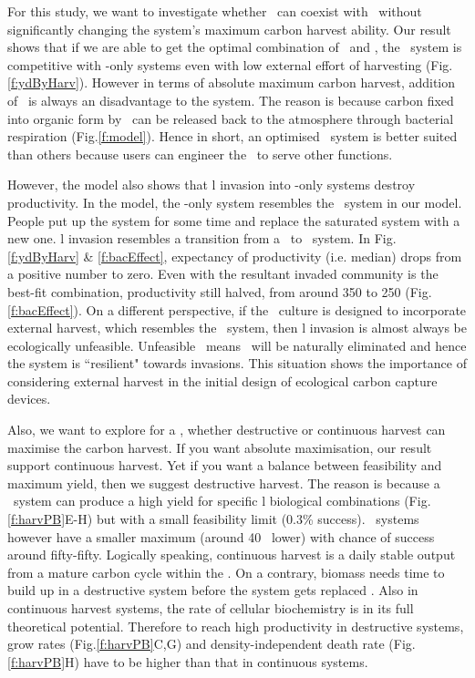 \documentclass[../thesis.tex]{subfiles} %
\begin{document}
For this study, we want to investigate whether \bac\ can coexist with \phy\ without significantly changing the system’s maximum carbon harvest ability.  Our result shows that if we are able to get the optimal combination of \phy\ and \bac, the \PBH\ system is competitive with \phy-only systems even with low external effort of harvesting (Fig.\ref{f:ydByHarv}).  However in terms of absolute maximum carbon harvest, addition of \bac\ is always an disadvantage to the system.  The reason is because carbon fixed into organic form by \phy\ can be released back to the atmosphere through bacterial respiration (Fig.\ref{f:model}).  Hence in short, an optimised \PBH\ system is better suited than others because users can engineer the \bac\ to serve other functions.

However, the model also shows that \bac l invasion into \phy-only systems destroy productivity.  In the model, the \phy-only system resembles the \PoN\ system in our model.  People put up the system for some time and replace the saturated system with a new one.  \Bac l invasion resembles a transition from a \PoN\ to \PBN\ system.  In Fig.\ref{f:ydByHarv} \& \ref{f:bacEffect}, expectancy of productivity (i.e. median) drops from a positive number to zero.  Even with the resultant invaded community is the best-fit combination, productivity still halved, from around 350 to 250 \dxdt (Fig.\ref{f:bacEffect}).  On a different perspective, if the \phy\ culture is designed to incorporate external harvest, which resembles the \PoH\ system, then \bac l invasion is almost always be ecologically unfeasible.  Unfeasible \PBH\ means \bac\ will be naturally eliminated and hence the system is ``resilient" towards invasions.  This situation shows the importance of considering external harvest in the initial design of ecological carbon capture devices.

Also, we want to explore for a \pbs, whether destructive or continuous harvest can maximise the carbon harvest.  If you want absolute maximisation, our result support continuous harvest.  Yet if you want a balance between feasibility and maximum yield, then we suggest destructive harvest.  The reason is because a \PBH\ system can produce a high yield for specific \bac l biological combinations (Fig.\ref{f:harvPB}E-H) but with a small feasibility limit (0.3\% success).  \PBN\ systems however have a smaller maximum (around 40 \dxdt\ lower) with chance of success around fifty-fifty.  Logically speaking, continuous harvest is a daily stable output from a mature carbon cycle within the \pbs.  On a contrary, biomass needs time to build up in a destructive system before the system gets replaced \autocite{aytekin2016statistical}.  Also in continuous harvest systems, the rate of cellular biochemistry is in its full theoretical potential.  Therefore to reach high productivity in destructive systems, grow rates (Fig.\ref{f:harvPB}C,G) and density-independent death rate (Fig.\ref{f:harvPB}H) have to be higher than that in continuous systems.
\end{document}
